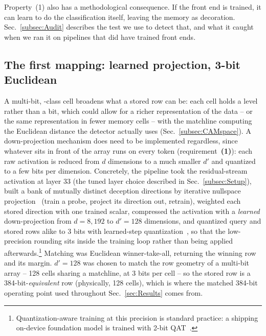 Property~(1) also has a methodological consequence. If the front end is
trained, it can learn to do the classification itself, leaving the
memory as decoration. Sec.~\ref{subsec:Audit} describes the test we
use to detect that, and what it caught when we ran it on pipelines
that did have trained front ends.

\subsection{The first mapping: learned projection, 3-bit Euclidean}
\label{subsec:FirstPipeline}
A multi-bit, \fefet-class cell broadens what a stored row can be:
each cell holds a level rather than a bit, which could allow for a
richer representation of the data -- or the same representation in
fewer memory cells -- with the matchline computing the Euclidean
distance the detector actually uses (Sec.~\ref{subsec:CAMspace}). A
down-projection mechanism does need to be implemented regardless,
since whatever sits in front of the array runs on every token
(requirement~{\bf (1)}): each raw activation is reduced from $d$
dimensions to a much smaller $d'$ and quantized to a few bits per
dimension.
Concretely, the pipeline took the residual-stream
activation at layer 33 (the tuned layer choice described in
Sec.~\ref{subsec:Setup}), built a bank of mutually distinct deception
directions by iterative nullspace
projection~\cite{ravfogel2020inlp} (train a probe, project its direction
out, retrain), weighted each stored direction with one trained scalar,
compressed the activation with a \emph{learned} down-projection from
$d=8{,}192$ to $d'=128$ dimensions, and quantized query and stored rows
alike to 3 bits with learned-step quantization~\cite{esser2020lsq}, so
that the low-precision rounding sits inside the training loop rather
than being applied afterwards.\footnote{Quantization-aware training at
this precision is standard practice: a shipping on-device foundation
model is trained with 2-bit QAT~\cite{apple2025foundation}.} Matching
was Euclidean winner-take-all, returning the winning row and its
margin. $d'=128$ was chosen to match the row geometry of a multi-bit
\fefet array -- 128 cells sharing a matchline, at 3 bits per cell --
so the stored row is a 384-bit-\emph{equivalent} row (physically, 128
cells), which is where the matched 384-bit operating point used
throughout Sec.~\ref{sec:Results} comes
from.


